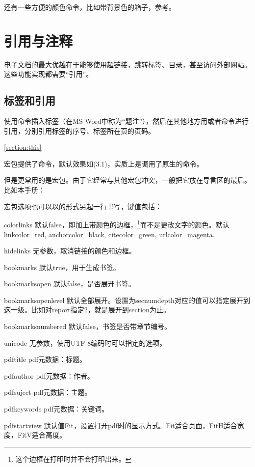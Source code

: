 还有一些方便的颜色命令，比如带背景色的箱子，参考。

\section{引用与注释}
电子文档的最大优越在于能够使用超链接，跳转标签、目录，甚至访问外部网站。这些功能实现都需要“引用”。
\subsection{标签和引用}
使用命令插入标签（在MS Word中称为“题注”），然后在其他地方用或者命令进行引用，分别引用标签的序号、标签所在页的页码。
\begin{latex}
\label{section:this}
\ref{section:this}
\pageref{section:this}
\end{latex}

宏包提供了命令，默认效果如(3.1)，实质上是调用了原生的命令。

但是更常用的是宏包。由于它经常与其他宏包冲突，一般把它放在导言区的最后。比如本手册：
\begin{latex}
\usepackage[colorlinks,bookmarksopen=true,
    bookmarksnumbered=true]{hyperref}
\end{latex}

宏包选项也可以以的形式另起一行书写，键值包括：
\begin{para}
\item[colorlinks] 默认false，即加上带颜色的边框，\footnote{这个边框在打印时并不会打印出来。}而不是更改文字的颜色。默认linkcolor=red, anchorcolor=black, citecolor=green, urlcolor=magenta. 
\item[hidelinks] 无参数，取消链接的颜色和边框。
\item[bookmarks] 默认true，用于生成书签。
\item[bookmarksopen] 默认false，是否展开书签。
\item[bookmarksopenlevel] 默认全部展开。设置为secnumdepth对应的值可以指定展开到这一级。比如对report指定2，就是展开到section为止。
\item[bookmarksnumbered] 默认false，书签是否带章节编号。
\item[unicode] 无参数，使用UTF-8编码时可以指定的选项。
\item[pdftitle] pdf元数据：标题。
\item[pdfauthor] pdf元数据：作者。
\item[pdfsuject] pdf元数据：主题。
\item[pdfkeywords] pdf元数据：关键词。
\item[pdfstartview] 默认值Fit，设置打开pdf时的显示方式。Fit适合页面，FitH适合宽度，FitV适合高度。
\end{para}


